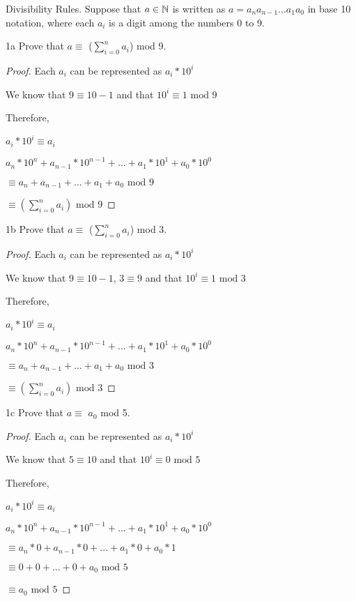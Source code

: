 \begin{question}{1}
Divisibility Rules. Suppose that $a \in \mathbb{N}$ is written as $a = a_na_{n-1}...a_1a_0$ in base 10 notation, where each $a_{i}$ is a digit among the numbers 0 to 9.
\end{question}


\begin{question}{1a}
Prove that $a\equiv$ ($\displaystyle\sum\limits_{i=0}^n a_i$) mod 9.
\begin{proof}

Each $a_i$ can be represented as $a_i*10^i$

We know that $9 \equiv 10-1$ and that $10^i \equiv 1 \textrm{ mod } 9$

Therefore, 

$a_i*10^i \equiv a_i$

$a_n*10^n + a_{n-1}*10^{n-1} + ... +a_1*10^1 + a_0*10^0$

$\equiv a_n + a_{n-1} + ... +a_1 + a_0 \textrm{ mod } 9$

$\equiv (\displaystyle\sum\limits_{i=0}^n a_i) \textrm{ mod } 9$


\end{proof}
\end{question}

\begin{question}{1b}
Prove that $a\equiv$ ($\displaystyle\sum\limits_{i=0}^n a_i$) mod 3.
\begin{proof}

Each $a_i$ can be represented as $a_i*10^i$

We know that $9 \equiv 10-1$, $3 \equiv 9$ and that $10^i \equiv 1 \textrm{ mod } 3$

Therefore, 

$a_i*10^i \equiv a_i$

$a_n*10^n + a_{n-1}*10^{n-1} + ... +a_1*10^1 + a_0*10^0$

$\equiv a_n + a_{n-1} + ... +a_1 + a_0 \textrm{ mod } 3$

$\equiv (\displaystyle\sum\limits_{i=0}^n a_i) \textrm{ mod } 3$


\end{proof}
\end{question}

\begin{question}{1c}
Prove that $a\equiv$ $a_0$ mod 5.
\begin{proof}

Each $a_i$ can be represented as $a_i*10^i$

We know that $5 \equiv 10$ and that $10^i \equiv 0 \textrm{ mod } 5$

Therefore, 

$a_i*10^i \equiv a_i$

$a_n*10^n + a_{n-1}*10^{n-1} + ... +a_1*10^1 + a_0*10^0$

$\equiv a_n*0 + a_{n-1}*0 + ... +a_1*0 + a_0*1$

$\equiv 0 + 0 + ... +0 + a_0 \textrm{ mod } 5$

$\equiv a_0 \textrm{ mod } 5$


\end{proof}
\end{question}

